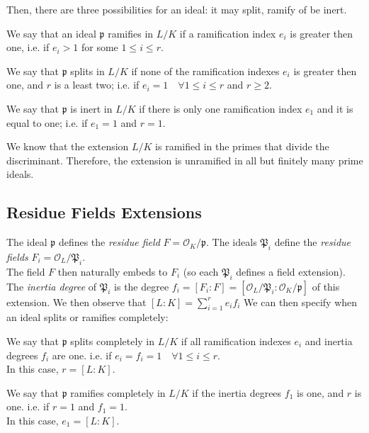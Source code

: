 Then, there are three possibilities for an ideal: it may split, ramify of be inert.
\begin{definition}
    We say that an ideal $\mathfrak{p}$ ramifies in $L/K$ if a ramification index $e_i$ is greater then one, 
    i.e. if $e_i>1$ for some $1 \leq i \leq r$.
\end{definition}
\begin{definition}
    We say that $\mathfrak{p}$ splits in $L/K$ if none of the ramification indexes $e_i$ is greater then one, and $r$ is a least two; 
    i.e. if $e_i=1 \quad \forall 1 \leq i \leq r$ and $r \geq 2$.
\end{definition}
\begin{definition}
    We say that $\mathfrak{p}$ is inert in $L/K$ if there is only one ramification index $e_1$ and it is equal to one;
    i.e. if $e_1=1$ and $r=1$.
\end{definition}
We know that the extension $L/K$ is ramified in the primes that divide the discriminant. Therefore, the extension is unramified in all but finitely many prime ideals.


\subsection{Residue Fields Extensions}
The ideal $\mathfrak{p}$ defines the \textit{residue field} $F=\mathcal{O}_K/\mathfrak{p}$.
The ideals $\mathfrak{P}_i$ define the \textit{residue fields} $F_i=\mathcal{O}_L/\mathfrak{P}_i$.\\
The field $F$ then naturally embeds to $F_i$ (so each $\mathfrak{P}_i$ defines a field extension).
The \textit{inertia degree} of $\mathfrak{P}_i$ is the degree $f_i=[F_i:F]=[\mathcal{O}_L/\mathfrak{P}_i:\mathcal{O}_K/\mathfrak{p}]$ of this extension.
We then observe that $[L:K] = \sum_{i=1}^r e_if_i$
We can then specify when an ideal splits or ramifies completely:
\begin{definition}
    We say that $\mathfrak{p}$ splits completely in $L/K$ if all ramification indexes $e_i$ and inertia degrees $f_i$ are one.
    i.e. if $e_i=f_i=1 \quad \forall 1 \leq i \leq r$.\\
    In this case, $r=[L:K]$.
\end{definition}
\begin{definition}
    We say that $\mathfrak{p}$ ramifies completely in $L/K$ if the inertia degrees $f_1$ is one, and $r$ is one.
    i.e. if $r=1$ and $f_1=1$.\\
    In this case, $e_1=[L:K]$.
\end{definition}

